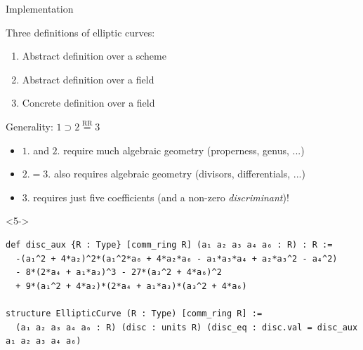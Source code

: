 \documentclass[10pt]{beamer}
\begin{document}
\begin{frame}[fragile, t]{Implementation}

Three definitions of elliptic curves:
\begin{enumerate}
\item Abstract definition over a scheme
\item Abstract definition over a field
\item Concrete definition over a field
\end{enumerate}
Generality: $ 1 \supset 2 \overset{\text{RR}}{=} 3 $
\begin{itemize}
\item<2-> $ 1. $ and $ 2. $ require much algebraic geometry (properness, genus, ...)
\item<3-> $ 2. = 3. $ also requires algebraic geometry (divisors, differentials, ...)
\item<4-> $ 3. $ requires just five coefficients (and a non-zero \emph{discriminant})!
\end{itemize}

\begin{onlyenv}<5->
\begin{lstlisting}[basicstyle=\scriptsize, frame=single]
def disc_aux {R : Type} [comm_ring R] (a₁ a₂ a₃ a₄ a₆ : R) : R :=
  -(a₁^2 + 4*a₂)^2*(a₁^2*a₆ + 4*a₂*a₆ - a₁*a₃*a₄ + a₂*a₃^2 - a₄^2)
  - 8*(2*a₄ + a₁*a₃)^3 - 27*(a₃^2 + 4*a₆)^2
  + 9*(a₁^2 + 4*a₂)*(2*a₄ + a₁*a₃)*(a₃^2 + 4*a₆)

structure EllipticCurve (R : Type) [comm_ring R] :=
  (a₁ a₂ a₃ a₄ a₆ : R) (disc : units R) (disc_eq : disc.val = disc_aux a₁ a₂ a₃ a₄ a₆)
\end{lstlisting}
\end{onlyenv}


\end{frame}
\end{document}
